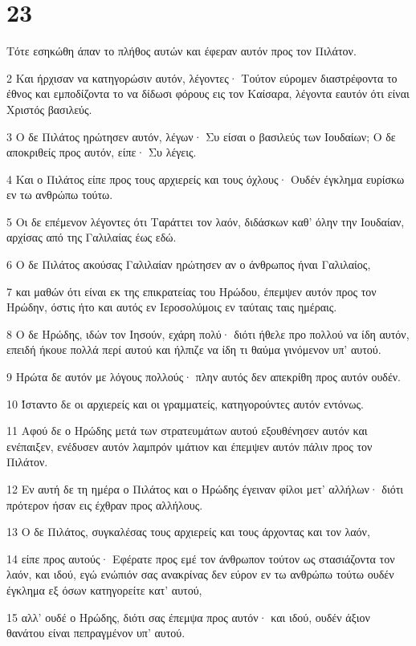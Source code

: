 \chapter{23}

\par Τότε εσηκώθη άπαν το πλήθος αυτών και έφεραν αυτόν προς τον Πιλάτον.
\par 2 Και ήρχισαν να κατηγορώσιν αυτόν, λέγοντες· Τούτον εύρομεν διαστρέφοντα το έθνος και εμποδίζοντα το να δίδωσι φόρους εις τον Καίσαρα, λέγοντα εαυτόν ότι είναι Χριστός βασιλεύς.
\par 3 Ο δε Πιλάτος ηρώτησεν αυτόν, λέγων· Συ είσαι ο βασιλεύς των Ιουδαίων; Ο δε αποκριθείς προς αυτόν, είπε· Συ λέγεις.
\par 4 Και ο Πιλάτος είπε προς τους αρχιερείς και τους όχλους· Ουδέν έγκλημα ευρίσκω εν τω ανθρώπω τούτω.
\par 5 Οι δε επέμενον λέγοντες ότι Ταράττει τον λαόν, διδάσκων καθ' όλην την Ιουδαίαν, αρχίσας από της Γαλιλαίας έως εδώ.
\par 6 Ο δε Πιλάτος ακούσας Γαλιλαίαν ηρώτησεν αν ο άνθρωπος ήναι Γαλιλαίος,
\par 7 και μαθών ότι είναι εκ της επικρατείας του Ηρώδου, έπεμψεν αυτόν προς τον Ηρώδην, όστις ήτο και αυτός εν Ιεροσολύμοις εν ταύταις ταις ημέραις.
\par 8 Ο δε Ηρώδης, ιδών τον Ιησούν, εχάρη πολύ· διότι ήθελε προ πολλού να ίδη αυτόν, επειδή ήκουε πολλά περί αυτού και ήλπιζε να ίδη τι θαύμα γινόμενον υπ' αυτού.
\par 9 Ηρώτα δε αυτόν με λόγους πολλούς· πλην αυτός δεν απεκρίθη προς αυτόν ουδέν.
\par 10 Ίσταντο δε οι αρχιερείς και οι γραμματείς, κατηγορούντες αυτόν εντόνως.
\par 11 Αφού δε ο Ηρώδης μετά των στρατευμάτων αυτού εξουθένησεν αυτόν και ενέπαιξεν, ενέδυσεν αυτόν λαμπρόν ιμάτιον και έπεμψεν αυτόν πάλιν προς τον Πιλάτον.
\par 12 Εν αυτή δε τη ημέρα ο Πιλάτος και ο Ηρώδης έγειναν φίλοι μετ' αλλήλων· διότι πρότερον ήσαν εις έχθραν προς αλλήλους.
\par 13 Ο δε Πιλάτος, συγκαλέσας τους αρχιερείς και τους άρχοντας και τον λαόν,
\par 14 είπε προς αυτούς· Εφέρατε προς εμέ τον άνθρωπον τούτον ως στασιάζοντα τον λαόν, και ιδού, εγώ ενώπιόν σας ανακρίνας δεν εύρον εν τω ανθρώπω τούτω ουδέν έγκλημα εξ όσων κατηγορείτε κατ' αυτού,
\par 15 αλλ' ουδέ ο Ηρώδης, διότι σας έπεμψα προς αυτόν· και ιδού, ουδέν άξιον θανάτου είναι πεπραγμένον υπ' αυτού.
